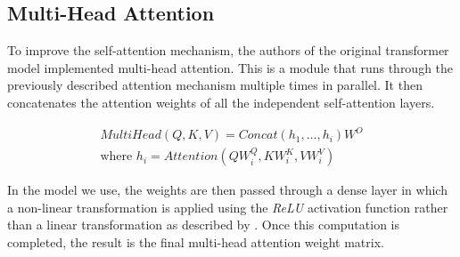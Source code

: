 \subsection{Multi-Head Attention}\label{sec:multi-head attention}
To improve the self-attention mechanism, the authors of the original transformer model implemented multi-head attention.
This is a module that runs through the previously described attention mechanism multiple times in parallel.
It then concatenates the attention weights of all the independent self-attention layers. 

\begin{align*}
MultiHead(Q, K, V) = Concat(h_1, \ldots, h_i)W^O \\
\text{where }h_i = Attention(QW^Q_i, KW^K_i, VW^V_i) 
\end{align*}

In the model we use, the weights are then passed through a dense layer in which a non-linear transformation is applied using the \textit{ReLU} activation function rather than a linear transformation as described by \citet{AttentionIsAllYouNeed}. 
Once this computation is completed, the result is the final multi-head attention weight matrix. \cite{AttentionIsAllYouNeed}
